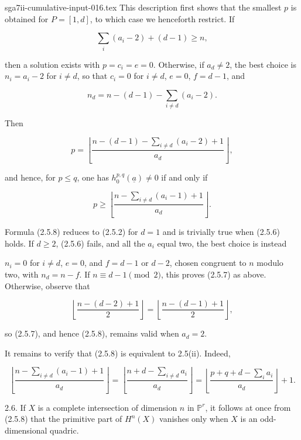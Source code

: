 \begin{filecontents*}{sga7ii-cumulative-input-016.tex}
This description first shows that the smallest $p$ is obtained for
$P=[1,d]$, to which case we henceforth restrict.  If

\begin{equation}\tag{2.5.6}
\sum_i(a_i-2)+(d-1)\geq n,
\end{equation}

then a solution exists with $p=c_i=e=0$.  Otherwise, if $a_d\ne2$, the
best choice is $n_i=a_i-2$ for $i\ne d$, so that $c_i=0$ for $i\ne d$,
$e=0$, $f=d-1$, and

\begin{equation*}
n_d=n-(d-1)-\sum_{i\ne d}(a_i-2).
\end{equation*}

Then

\begin{equation}\tag{2.5.7}
p=\left\lfloor
\frac{n-(d-1)-\sum_{i\ne d}(a_i-2)+1}{a_d}
\right\rfloor,
\end{equation}

and hence, for $p\leq q$, one has
$h_0^{p,q}(\underline a)\ne0$ if and only if

\begin{equation}\tag{2.5.8}
p\geq\left\lfloor
\frac{n-\sum_{i\ne d}(a_i-1)+1}{a_d}
\right\rfloor.
\end{equation}

Formula (2.5.8) reduces to (2.5.2) for $d=1$ and is trivially true when
(2.5.6) holds.  If $d\geq2$, (2.5.6) fails, and all the $a_i$ equal two,
the best choice is instead


$n_i=0$ for $i\ne d$, $e=0$, and $f=d-1$ or $d-2$, chosen congruent to
$n$ modulo two, with $n_d=n-f$.  If $n\equiv d-1\pmod2$, this proves
(2.5.7) as above.  Otherwise, observe that

\begin{equation*}
\left\lfloor\frac{n-(d-2)+1}{2}\right\rfloor
=\left\lfloor\frac{n-(d-1)+1}{2}\right\rfloor,
\end{equation*}

so (2.5.7), and hence (2.5.8), remains valid when $a_d=2$.

It remains to verify that (2.5.8) is equivalent to 2.5(ii).  Indeed,

\begin{equation*}
\left\lfloor\frac{n-\sum_{i\ne d}(a_i-1)+1}{a_d}\right\rfloor
=\left\lfloor\frac{n+d-\sum_{i\ne d}a_i}{a_d}\right\rfloor
=\left\lfloor\frac{p+q+d-\sum_i a_i}{a_d}\right\rfloor+1.
\end{equation*}

2.6. If $X$ is a complete intersection of dimension $n$ in
$\mathbb P^r$, it follows at once from (2.5.8) that the primitive part of
$H^n(X)$ vanishes only when $X$ is an odd-dimensional quadric.

\end{filecontents*}
